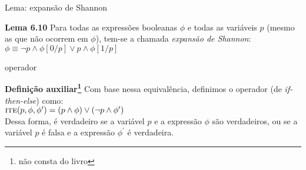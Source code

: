 \expandafter\documentclass\expandafter[table, usenames, svgnames, dvipsnames,14pt, \classopts]{beamer}
\begin{document}
\begin{frame}{Lema: expansão de Shannon}

    \begin{block}{\textbf{Lema 6.10}}
        Para todas as expressões booleanas $\phi$ e todas as variáveis $p$ (mesmo as que não ocorrem em $\phi$), tem-se a chamada \textit{expansão de Shannon}:\\[1em]
        $\phi \equiv \lnot{p} \land \phi[0/p] \lor p \land \phi[1/p]$
    \end{block}

\end{frame}

\begin{frame}{operador }

    \begin{block}{\textbf{Definição auxiliar\footnote{não consta do livro}}}
        Com base nessa equivalência, definimos o operador  (de \textit{if-then-else}) como:\\[1em]
        $\textproc{ite}(p,\phi,\phi^{\prime}) = (p \land \phi) \lor (\lnot{p} \land \phi^{\prime})$
        \\[1em]
        Dessa forma,  é verdadeiro se a variável $p$ e a expressão $\phi$ são verdadeiros, ou se a variável $p$ é falsa e a expressão $\phi^{\prime}$ é verdadeira.
    \end{block}

\end{frame}
\end{document}
